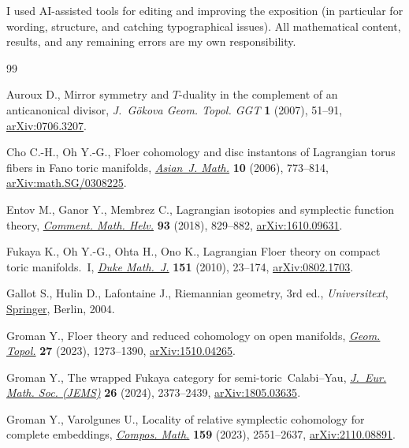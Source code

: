 \documentclass[10pt,a4paper]{amsart}
\numberwithin{equation}{section}
\theoremstyle{definition}
\begin{document}
I used AI-assisted tools for editing and improving the exposition (in particular for wording, structure, and catching typographical issues).
All mathematical content, results, and any remaining errors are my own responsibility.

\begin{thebibliography}{99}
\footnotesize\itemsep=0pt

Auroux D., Mirror symmetry and {$T$}-duality in the complement of an
 anticanonical divisor, \textit{J.~G\"okova Geom. Topol. GGT} \textbf{1}
 (2007), 51--91, \href{http://arxiv.org/abs/0706.3207}{arXiv:0706.3207}.

Cho C.-H., Oh Y.-G., Floer cohomology and disc instantons of {L}agrangian torus
 fibers in {F}ano toric manifolds,
 \href{https://doi.org/10.4310/AJM.2006.v10.n4.a10}{\textit{Asian~J. Math.}}
 \textbf{10} (2006), 773--814,
 \href{http://arxiv.org/abs/math.SG/0308225}{arXiv:math.SG/0308225}.

Entov M., Ganor Y., Membrez C., Lagrangian isotopies and symplectic function
 theory, \href{https://doi.org/10.4171/CMH/451}{\textit{Comment. Math. Helv.}}
 \textbf{93} (2018), 829--882,
 \href{http://arxiv.org/abs/1610.09631}{arXiv:1610.09631}.

Fukaya K., Oh Y.-G., Ohta H., Ono K., Lagrangian {F}loer theory on compact toric
 manifolds.~{I}, \href{https://doi.org/10.1215/00127094-2009-062}{\textit{Duke
 Math.~J.}} \textbf{151} (2010), 23--174,
 \href{http://arxiv.org/abs/0802.1703}{arXiv:0802.1703}.

Gallot S., Hulin D., Lafontaine J., Riemannian geometry, 3rd ed., \textit{Universitext},
 \href{https://doi.org/10.1007/978-3-642-18855-8}{Springer}, Berlin, 2004.

Groman Y., Floer theory and reduced cohomology on open manifolds,
 \href{https://doi.org/10.2140/gt.2023.27.1273}{\textit{Geom. Topol.}}
 \textbf{27} (2023), 1273--1390,
 \href{http://arxiv.org/abs/1510.04265}{arXiv:1510.04265}.

Groman Y., The wrapped {F}ukaya category for semi-toric~{C}alabi--{Y}au,
 \href{https://doi.org/10.4171/jems/1466}{\textit{J.~Eur. Math. Soc. (JEMS)}}
 \textbf{26} (2024), 2373--2439,
 \href{http://arxiv.org/abs/1805.03635}{arXiv:1805.03635}.

Groman Y., Varolgunes U., Locality of relative symplectic cohomology for
 complete embeddings,
 \href{https://doi.org/10.1112/s0010437x23007492}{\textit{Compos. Math.}}
 \textbf{159} (2023), 2551--2637,
 \href{http://arxiv.org/abs/2110.08891}{arXiv:2110.08891}.


\end{thebibliography}
\end{document}
